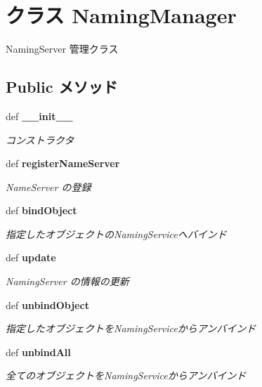 \section{クラス NamingManager}
\label{classsource__py_1_1_naming_manager_1_1_naming_manager}
NamingServer 管理クラス  


\subsection*{Public メソッド}
\begin{CompactItemize}
\item 
def {\bf \_\-\_\-init\_\-\_\-}
\begin{CompactList}\small\item\em コンストラクタ \item\end{CompactList}\item 
def {\bf registerNameServer}
\begin{CompactList}\small\item\em NameServer の登録 \item\end{CompactList}\item 
def {\bf bindObject}
\begin{CompactList}\small\item\em 指定したオブジェクトのNamingServiceへバインド \item\end{CompactList}\item 
def {\bf update}
\begin{CompactList}\small\item\em NamingServer の情報の更新 \item\end{CompactList}\item 
def {\bf unbindObject}
\begin{CompactList}\small\item\em 指定したオブジェクトをNamingServiceからアンバインド \item\end{CompactList}\item 
def {\bf unbindAll}
\begin{CompactList}\small\item\em 全てのオブジェクトをNamingServiceからアンバインド \item\end{CompactList}\item 

\end{CompactItemize}
